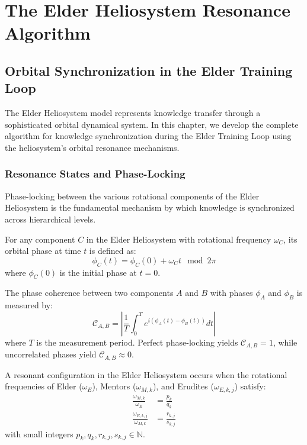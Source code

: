 \chapter{The Elder Heliosystem Resonance Algorithm}

\section{Orbital Synchronization in the Elder Training Loop}

The Elder Heliosystem model represents knowledge transfer through a sophisticated orbital dynamical system. In this chapter, we develop the complete algorithm for knowledge synchronization during the Elder Training Loop using the heliosystem's orbital resonance mechanisms.

\subsection{Resonance States and Phase-Locking}

Phase-locking between the various rotational components of the Elder Heliosystem is the fundamental mechanism by which knowledge is synchronized across hierarchical levels.

\begin{definition}
For any component $C$ in the Elder Heliosystem with rotational frequency $\omega_C$, its orbital phase at time $t$ is defined as:
\begin{equation}
\phi_C(t) = \phi_C(0) + \omega_C t \mod 2\pi
\end{equation}
where $\phi_C(0)$ is the initial phase at $t=0$.
\end{definition}

\begin{definition}
The phase coherence between two components $A$ and $B$ with phases $\phi_A$ and $\phi_B$ is measured by:
\begin{equation}
\mathcal{C}_{A,B} = \left| \frac{1}{T} \int_0^T e^{i(\phi_A(t) - \phi_B(t))} dt \right|
\end{equation}
where $T$ is the measurement period. Perfect phase-locking yields $\mathcal{C}_{A,B} = 1$, while uncorrelated phases yield $\mathcal{C}_{A,B} \approx 0$.
\end{definition}

\begin{theorem}
A resonant configuration in the Elder Heliosystem occurs when the rotational frequencies of Elder ($\omega_E$), Mentors ($\omega_{M,k}$), and Erudites ($\omega_{E,k,j}$) satisfy:
\begin{align}
\frac{\omega_{M,k}}{\omega_E} &= \frac{p_k}{q_k} \\
\frac{\omega_{E,k,j}}{\omega_{M,k}} &= \frac{r_{k,j}}{s_{k,j}}
\end{align}
with small integers $p_k, q_k, r_{k,j}, s_{k,j} \in \mathbb{N}$.
\end{theorem}

